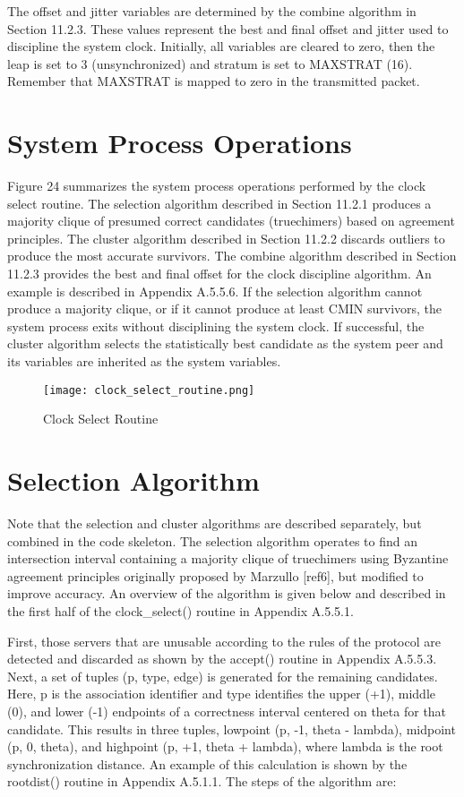 The offset and jitter variables are determined by the combine
algorithm in Section 11.2.3.  These values represent the best and
final offset and jitter used to discipline the system clock.
Initially, all variables are cleared to zero, then the leap is set to
3 (unsynchronized) and stratum is set to MAXSTRAT (16).  Remember
that MAXSTRAT is mapped to zero in the transmitted packet.

\section{System Process Operations}

Figure 24 summarizes the system process operations performed by the
clock select routine.  The selection algorithm described in
Section 11.2.1 produces a majority clique of presumed correct
candidates (truechimers) based on agreement principles.  The cluster
algorithm described in Section 11.2.2 discards outliers to produce
the most accurate survivors.  The combine algorithm described in
Section 11.2.3 provides the best and final offset for the clock
discipline algorithm.  An example is described in Appendix A.5.5.6.
If the selection algorithm cannot produce a majority clique, or if it
cannot produce at least CMIN survivors, the system process exits
without disciplining the system clock.  If successful, the cluster
algorithm selects the statistically best candidate as the system peer
and its variables are inherited as the system variables.

\begin{figure}
\centering
\texttt{[image: clock\_select\_routine.png]}
\caption{Clock Select Routine}
\label{clock_select_routine}
\end{figure}

\section{Selection Algorithm}

Note that the selection and cluster algorithms are described
separately, but combined in the code skeleton.  The selection
algorithm operates to find an intersection interval containing a
majority clique of truechimers using Byzantine agreement principles
originally proposed by Marzullo [ref6], but modified to improve
accuracy.  An overview of the algorithm is given below and described
in the first half of the clock\_select() routine in Appendix A.5.5.1.

First, those servers that are unusable according to the rules of the
protocol are detected and discarded as shown by the accept() routine
in Appendix A.5.5.3.  Next, a set of tuples (p, type, edge) is
generated for the remaining candidates.  Here, p is the association
identifier and type identifies the upper (+1), middle (0), and lower
(-1) endpoints of a correctness interval centered on theta for that
candidate.  This results in three tuples, lowpoint (p, -1, theta -
lambda), midpoint (p, 0, theta), and highpoint (p, +1, theta +
lambda), where lambda is the root synchronization distance.  An
example of this calculation is shown by the rootdist() routine in
Appendix A.5.1.1.  The steps of the algorithm are:

